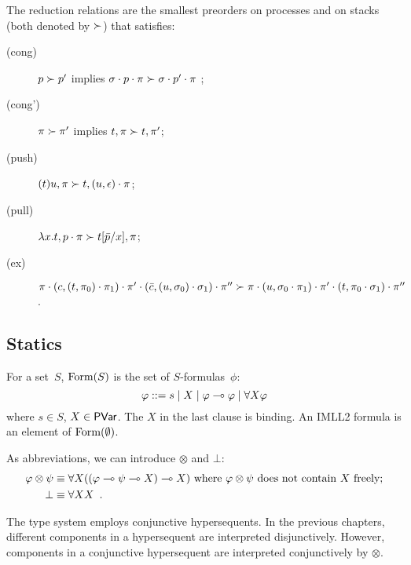 The reduction relations are the smallest preorders on processes
 and on stacks (both denoted by $\succ$) that satisfies:
\begin{description}
 \item[(cong)] $p\succ p'$ implies $\sigma \cdot p \cdot \pi\succ
      \sigma\cdot p'\cdot \pi$ \enspace;
 \item[(cong')] $\pi\succ\pi'$ implies $t,\pi\succ t,\pi'$\enspace;
 \item[(push)]
	    $(t)u, \pi   \succ t,(u,\epsilon)\cdot\pi$\enspace;
 \item[(pull)]
	    $\lambda x.t,p\cdot\pi
	     \succ
	     t[\bar p/x], \pi$\enspace;
 \item[(ex)]
           $\pi\cdot (c, (t,\pi_0)\cdot \pi_1)\cdot\pi' \cdot (\bar{c},(u,\sigma_0)\cdot \sigma_1) \cdot \pi''\succ
      \pi\cdot (u, \sigma_0\cdot \pi_1)\cdot\pi' \cdot (
      t,\pi_0\cdot \sigma_1) \cdot \pi''
      $
      \enspace.
\end{description}


\subsection{Statics}

For a set~$S$,
$\mathop{\text{Form}}(S)$ is the set of $S$-formulas~$\phi$:
\[
\varphi::= s \mid X \mid \varphi\multimap\varphi\mid
\forall X \varphi
\]
where $s\in S$, $X\in \mathsf{PVar}$. The $X$ in the
last clause is binding.
An IMLL2 formula is an element of $\mathop{\text{Form}}(\emptyset)$.

As abbreviations, we can introduce $\otimes$ and $\bot$:
\begin{align*}
 \varphi\otimes\psi &\equiv \forall X ((\varphi\multimap\psi\multimap X)\multimap X)
 \text{ where }\varphi\otimes\psi\text{ does not contain } X \text{ freely;}\\
 \bot &\equiv \forall X X\enspace.
\end{align*}

The type system employs conjunctive hypersequents.  In the previous
chapters,
different components in a hypersequent are interpreted disjunctively.
However, components in a conjunctive hypersequent are interpreted
conjunctively by $\otimes$.

